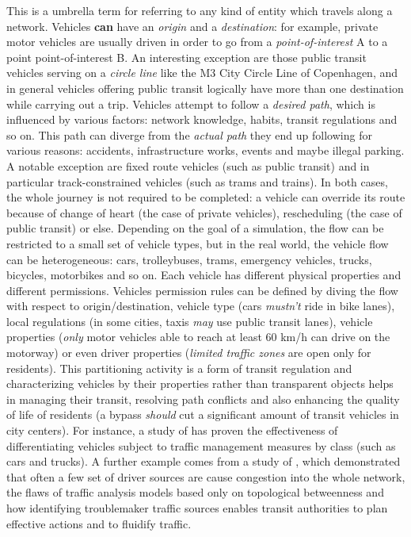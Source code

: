This is a umbrella term for referring to any kind of entity which travels along a network.
Vehicles \textbf{can} have an \textit{origin} and a \textit{destination}: for example, private motor vehicles are usually driven in order to go from a \textit{point-of-interest} A to a point point-of-interest B.
An interesting exception are those public transit vehicles serving on a \textit{circle line} like the M3 City Circle Line of Copenhagen, and in general vehicles offering public transit logically have more than one destination while carrying out a trip.
Vehicles attempt to follow a \textit{desired path}, which is influenced by various factors: network knowledge, habits, transit regulations and so on.
This path can diverge from the \textit{actual path} they end up following for various reasons: accidents, infrastructure works, events and maybe illegal parking.
A notable exception are fixed route vehicles (such as public transit) and in particular track-constrained vehicles (such as trams and trains).
In both cases, the whole journey is not required to be completed: a vehicle can override its route because of change of heart (the case of private vehicles), rescheduling (the case of public transit) or else.
Depending on the goal of a simulation, the flow can be restricted to a small set of vehicle types, but in the real world, the vehicle flow can be heterogeneous: cars, trolleybuses, trams, emergency vehicles, trucks, bicycles, motorbikes and so on. Each vehicle has different physical properties and different permissions.
Vehicles permission rules can be defined by diving the flow with respect to origin/destination, vehicle type (cars \textit{mustn't} ride in bike lanes), local regulations (in some cities, taxis \textit{may} use public transit lanes), vehicle properties (\textit{only} motor vehicles able to reach at least 60 km/h can drive on the motorway) or even driver properties (\textit{limited traffic zones} are open only for residents).
This partitioning activity is a form of transit regulation and characterizing vehicles by their properties rather than transparent objects helps in managing their transit, resolving path conflicts and also enhancing the quality of life of residents (a bypass \textit{should} cut a significant amount of transit vehicles in city centers).
For instance, a study of \citeauthor{schreiter2013vehicle} \cite{schreiter2013vehicle} has proven the effectiveness of differentiating vehicles subject to traffic management measures by class (such as cars and trucks).
A further example comes from a study of \citeauthor{wang2012understanding} \cite{wang2012understanding}, which demonstrated that often a few set of driver sources are cause congestion into the whole network, the flaws of traffic analysis models based only on topological betweenness and how identifying troublemaker traffic sources enables transit authorities to plan effective actions and to fluidify traffic.

